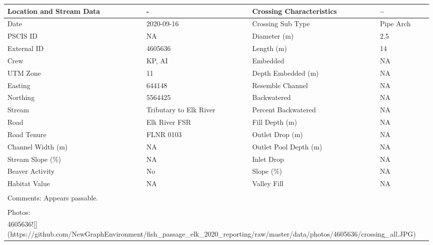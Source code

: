 \documentclass[
]{book}
\begin{document}
\begin{tabular}{l|l|l|l}
\hline
Location and Stream Data & - & Crossing Characteristics & --\\
\hline
Date & 2020-09-16 & Crossing Sub Type & Pipe Arch\\
\hline
PSCIS ID & NA & Diameter (m) & 2.5\\
\hline
External ID & 4605636 & Length (m) & 14\\
\hline
Crew & KP, AI & Embedded & NA\\
\hline
UTM Zone & 11 & Depth Embedded (m) & NA\\
\hline
Easting & 644148 & Resemble Channel & NA\\
\hline
Northing & 5564425 & Backwatered & NA\\
\hline
Stream & Tributary to Elk River & Percent Backwatered & NA\\
\hline
Road & Elk River FSR & Fill Depth (m) & NA\\
\hline
Road Tenure & FLNR 0103 & Outlet Drop (m) & NA\\
\hline
Channel Width (m) & NA & Outlet Pool Depth (m) & NA\\
\hline
Stream Slope (\%) & NA & Inlet Drop & NA\\
\hline
Beaver Activity & No & Slope (\%) & NA\\
\hline
Habitat Value & NA & Valley Fill & NA\\
\hline
\multicolumn{4}{l}{\textsuperscript{} Comments: Appears passable.}\\
\multicolumn{4}{l}{\textsuperscript{} Photos:}\\
\multicolumn{4}{l}{4605636![](https://github.com/NewGraphEnvironment/fish\_passage\_elk\_2020\_reporting/raw/master/data/photos/4605636/crossing\_all.JPG)}\\
\end{tabular}
\end{document}
